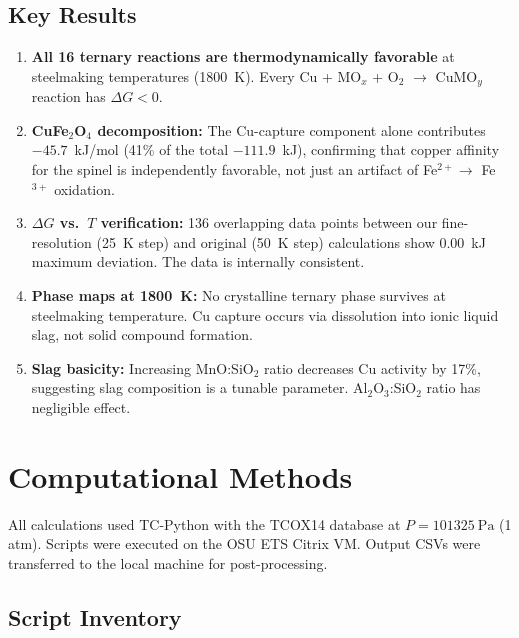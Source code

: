 \documentclass[11pt]{article}
\begin{document}
\subsection{Key Results}

\begin{enumerate}[leftmargin=*]
    \item \textbf{All 16 ternary reactions are thermodynamically favorable} at steelmaking temperatures (\SI{1800}{\kelvin}). Every Cu + MO$_x$ + O$_2$ $\rightarrow$ CuMO$_y$ reaction has $\Delta G < 0$.

    \item \textbf{CuFe$_2$O$_4$ decomposition:} The Cu-capture component alone contributes $-45.7$~kJ/mol (41\% of the total $-111.9$~kJ), confirming that copper affinity for the spinel is independently favorable, not just an artifact of Fe$^{2+} \rightarrow$ Fe$^{3+}$ oxidation.

    \item \textbf{$\Delta G$ vs.\ $T$ verification:} 136 overlapping data points between our fine-resolution (25~K step) and original (50~K step) calculations show 0.00~kJ maximum deviation. The data is internally consistent.

    \item \textbf{Phase maps at \SI{1800}{\kelvin}:} No crystalline ternary phase survives at steelmaking temperature. Cu capture occurs via dissolution into ionic liquid slag, not solid compound formation.

    \item \textbf{Slag basicity:} Increasing MnO:SiO$_2$ ratio decreases Cu activity by 17\%, suggesting slag composition is a tunable parameter. Al$_2$O$_3$:SiO$_2$ ratio has negligible effect.
\end{enumerate}

\section{Computational Methods}

All calculations used TC-Python with the TCOX14 database at $P = \SI{101325}{\pascal}$ (1 atm). Scripts were executed on the OSU ETS Citrix VM. Output CSVs were transferred to the local machine for post-processing.

\subsection{Script Inventory}
\end{document}
